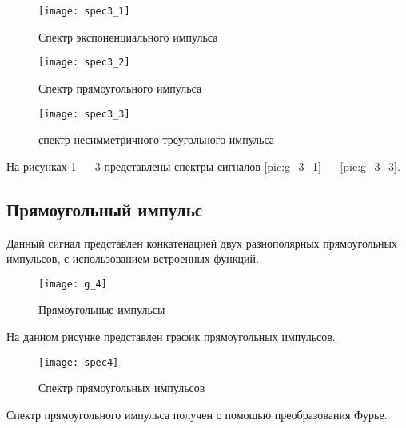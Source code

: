 \begin{figure}[H]
	\begin{center}
		\texttt{[image: spec3\_1]}
		\caption{Спектр экспоненциального импульса} 
		\label{pic:spec3_1} %
	\end{center}
\end{figure}
\begin{figure}[H]
	\begin{center}
		\texttt{[image: spec3\_2]}
		\caption{Спектр прямоугольного импульса} 
		\label{pic:spec3_2} %
	\end{center}
\end{figure}
\begin{figure}[H]
	\begin{center}
		\texttt{[image: spec3\_3]}
		\caption{спектр несимметричного треугольного импульса} 
		\label{pic:spec3_3} %
	\end{center}
\end{figure}
На рисунках  \ref{pic:spec3_1} — \ref{pic:spec3_3} представлены спектры сигналов \ref{pic:g_3_1} — \ref{pic:g_3_3}.

\subsection{Прямоугольный импульс}


\parindent=1cm
Данный сигнал представлен конкатенацией двух разнополярных прямоугольных импульсов, с использованием встроенных функций.

\begin{figure}[H]
	\begin{center}
		\texttt{[image: g\_4]}
		\caption{Прямоугольные импульсы} 
		\label{pic:g_4} %
	\end{center}
\end{figure}
На данном рисунке представлен график прямоугольных импульсов.

\begin{figure}[H]
	\begin{center}
		\texttt{[image: spec4]}
		\caption{Спектр прямоугольных импульсов} 
		\label{pic:spec4} %
	\end{center}
\end{figure}
Спектр прямоугольного импульса получен с помощью преобразования Фурье.

